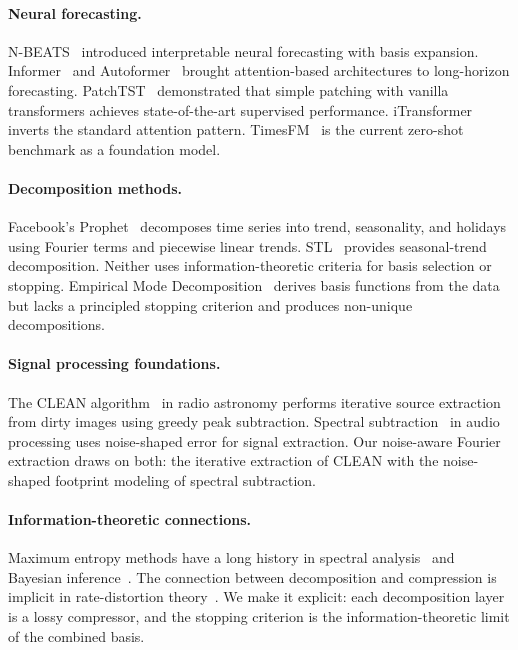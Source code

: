 \documentclass[sigconf,nonacm]{acmart}
\begin{document}
\paragraph{Neural forecasting.}
N-BEATS~\cite{oreshkin2020} introduced interpretable neural forecasting with basis expansion. Informer~\cite{zhou2021} and Autoformer~\cite{wu2021} brought attention-based architectures to long-horizon forecasting. PatchTST~\cite{nie2023} demonstrated that simple patching with vanilla transformers achieves state-of-the-art supervised performance. iTransformer~\cite{liu2024} inverts the standard attention pattern. TimesFM~\cite{das2024} is the current zero-shot benchmark as a foundation model.

\paragraph{Decomposition methods.}
Facebook's Prophet~\cite{taylor2018} decomposes time series into trend, seasonality, and holidays using Fourier terms and piecewise linear trends. STL~\cite{cleveland1990} provides seasonal-trend decomposition. Neither uses information-theoretic criteria for basis selection or stopping. Empirical Mode Decomposition~\cite{huang1998} derives basis functions from the data but lacks a principled stopping criterion and produces non-unique decompositions.

\paragraph{Signal processing foundations.}
The CLEAN algorithm~\cite{hogbom1974} in radio astronomy performs iterative source extraction from dirty images using greedy peak subtraction. Spectral subtraction~\cite{boll1979} in audio processing uses noise-shaped error for signal extraction. Our noise-aware Fourier extraction draws on both: the iterative extraction of CLEAN with the noise-shaped footprint modeling of spectral subtraction.

\paragraph{Information-theoretic connections.}
Maximum entropy methods have a long history in spectral analysis~\cite{burg1967} and Bayesian inference~\cite{jaynes2003}. The connection between decomposition and compression is implicit in rate-distortion theory~\cite{shannon1959}. We make it explicit: each decomposition layer is a lossy compressor, and the stopping criterion is the information-theoretic limit of the combined basis.
\end{document}
